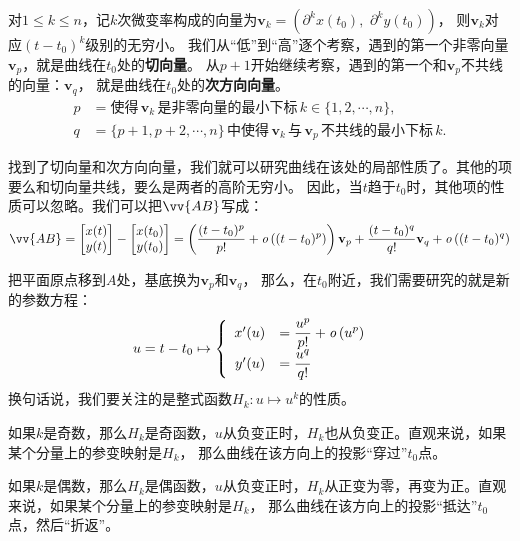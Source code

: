 \documentclass[12pt,UTF8]{ctexbook}
\newcommand{\olim}[1]{\mathit{o}\left(#1\right)}  %
\theoremstyle{definition}
\theoremstyle{plain}
\begin{document}
对$1\leqslant k\leqslant n$，记$k$次微变率构成的向量为$\mathbf{v}_k = (\partial^k x(t_0) ,\,\, \partial^k y(t_0))$，
则$\mathbf{v}_k$对应$(t - t_0)^k$级别的无穷小。
我们从“低”到“高”逐个考察，遇到的第一个非零向量$\mathbf{v}_p$，就是曲线在$t_0$处的\textbf{切向量}。
从$p+1$开始继续考察，遇到的第一个和$\mathbf{v}_p$不共线的向量：$\mathbf{v}_q$，
就是曲线在$t_0$处的\textbf{次方向向量}。
\begin{align*}
    p &= \mbox{使得}\,\mathbf{v}_k\,\mbox{是非零向量的最小下标}\,k\in\{1,2,\cdots, n\}, \\
    q &= \{p+1,p+2,\cdots, n\}\,\mbox{中使得}\,\mathbf{v}_k\,\mbox{与}\,\mathbf{v}_p\,\mbox{不共线的最小下标}\, k. 
\end{align*}

找到了切向量和次方向向量，我们就可以研究曲线在该处的局部性质了。其他的项要么和切向量共线，要么是两者的高阶无穷小。
因此，当$t$趋于$t_0$时，其他项的性质可以忽略。我们可以把$\vv{AB}$写成：
$$
\vv{AB} = \begin{bmatrix} x(t) \\ y(t) \end{bmatrix} - \begin{bmatrix} x(t_0) \\ y(t_0) \end{bmatrix}
=
\left(\frac{(t - t_0)^p}{p!} + \olim{(t - t_0)^p}\right)\mathbf{v}_p
+
\frac{(t - t_0)^q}{q!}\mathbf{v}_q
+
\olim{(t - t_0)^q}
$$

把平面原点移到$A$处，基底换为$\mathbf{v}_p$和$\mathbf{v}_q$，
那么，在$t_0$附近，我们需要研究的就是新的参数方程：
\begin{align*}
    u = t - t_0 &\mapsto\left\{
        \begin{array}[]{rl}
            x'(u) &\displaystyle = \frac{u^p}{p!} + \olim{u^p} \\
            y'(u) &\displaystyle = \frac{u^q}{q!} \\
        \end{array}
    \right.
\end{align*}
换句话说，我们要关注的是整式函数$H_k: u\mapsto u^k$的性质。

如果$k$是奇数，那么$H_k$是奇函数，$u$从负变正时，$H_k$也从负变正。直观来说，如果某个分量上的参变映射是$H_k$，
那么曲线在该方向上的投影“穿过”$t_0$点。

如果$k$是偶数，那么$H_k$是偶函数，$u$从负变正时，$H_k$从正变为零，再变为正。直观来说，如果某个分量上的参变映射是$H_k$，
那么曲线在该方向上的投影“抵达”$t_0$点，然后“折返”。
\end{document}
